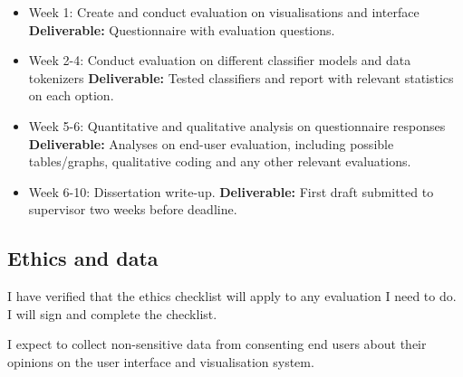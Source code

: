 \documentclass[11pt]{article}
\begin{document}
\begin{itemize}
    \tightlist
    \item
      Week 1: Create and conduct evaluation on visualisations and interface \textbf{Deliverable:}
      Questionnaire with evaluation questions.
    \item
      Week 2-4: Conduct evaluation on different classifier models and data tokenizers \textbf{Deliverable:} Tested classifiers and report with relevant statistics on each option.
    \item
      Week 5-6: Quantitative and qualitative analysis on questionnaire responses
      \textbf{Deliverable:} Analyses on end-user evaluation, including possible tables/graphs, qualitative coding and any other relevant evaluations.
    \item
      Week 6-10: Dissertation write-up.
      \textbf{Deliverable:} First draft submitted to supervisor two weeks before deadline.
    \end{itemize}
 
\subsection{Ethics and data}\label{ethics}
I have verified that the ethics checklist will apply to any evaluation I need to do. I will sign and complete the checklist. 

I expect to collect non-sensitive data from consenting end users about their opinions on the user interface and visualisation system.
\end{document}
